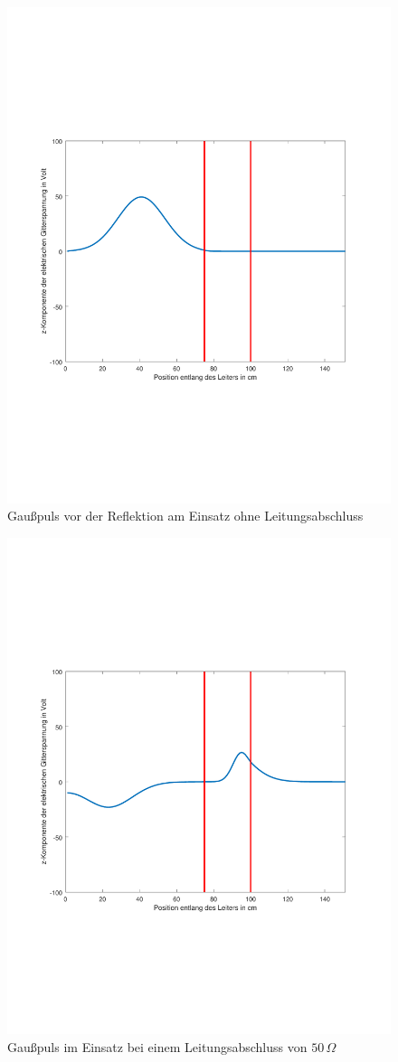 \documentclass[Protokollheft.tex]{subfiles}
\begin{document}
\begin{figure}[ht]
	\centering
	\includegraphics[trim = 15mm 65mm 20mm 65mm, clip,width=0.7\linewidth]{untitledG1.pdf}
	\caption{Gaußpuls vor der Reflektion am Einsatz ohne Leitungsabschluss}\label{fig:inh4}
\end{figure} 
\begin{figure}[ht]
	\centering
	\includegraphics[trim = 15mm 65mm 20mm 65mm, clip,width=0.7\linewidth]{untitledG2.pdf}
	\caption{Gaußpuls im Einsatz bei einem Leitungsabschluss von $50\,\Omega$}\label{fig:inh5}
\end{figure} 
\end{document}
